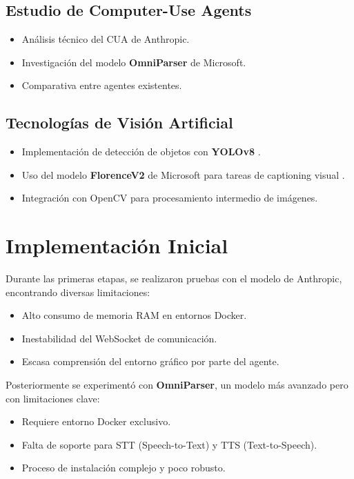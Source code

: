 \subsection{Estudio de Computer-Use Agents}

\begin{itemize}
    \item Análisis técnico del CUA de Anthropic.
    \item Investigación del modelo \textbf{OmniParser} de Microsoft.
    \item Comparativa entre agentes existentes.
\end{itemize}

\subsection{Tecnologías de Visión Artificial}

\begin{itemize}
    \item Implementación de detección de objetos con \textbf{YOLOv8} \cite{ultralytics}.
    \item Uso del modelo \textbf{FlorenceV2} de Microsoft para tareas de captioning visual \cite{microsoftFlorence2}.
    \item Integración con OpenCV para procesamiento intermedio de imágenes.
\end{itemize}

\section{Implementación Inicial}

Durante las primeras etapas, se realizaron pruebas con el modelo de Anthropic, encontrando diversas limitaciones:

\begin{itemize}
    \item Alto consumo de memoria RAM en entornos Docker.
    \item Inestabilidad del WebSocket de comunicación.
    \item Escasa comprensión del entorno gráfico por parte del agente.
\end{itemize}

Posteriormente se experimentó con \textbf{OmniParser}, un modelo más avanzado pero con limitaciones clave:
\begin{itemize}
    \item Requiere entorno Docker exclusivo.
    \item Falta de soporte para STT (Speech-to-Text) y TTS (Text-to-Speech).
    \item Proceso de instalación complejo y poco robusto.
\end{itemize}

